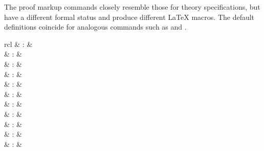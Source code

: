 \begin{isabellebody}
\begin{isamarkuptext}
  \medskip The proof markup commands closely resemble those for theory
  specifications, but have a different formal status and produce
  different {\LaTeX} macros.  The default definitions coincide for
  analogous commands such as \hyperlink{command.section}{\mbox{}} and \hyperlink{command.sect}{\mbox{}}.%
\end{isamarkuptext}%
\isamarkuptrue%
%
\isamarkuptrue%
%
\begin{isamarkuptext}%
\begin{matharray}{rcl}
    \hypertarget{antiquotation.theory}{\hyperlink{antiquotation.theory}{\mbox{}}} & : &  \\
    \hypertarget{antiquotation.thm}{\hyperlink{antiquotation.thm}{\mbox{}}} & : &  \\
    \hypertarget{antiquotation.lemma}{\hyperlink{antiquotation.lemma}{\mbox{}}} & : &  \\
    \hypertarget{antiquotation.prop}{\hyperlink{antiquotation.prop}{\mbox{}}} & : &  \\
    \hypertarget{antiquotation.term}{\hyperlink{antiquotation.term}{\mbox{}}} & : &  \\
    \hypertarget{antiquotation.term-type}{\hyperlink{antiquotation.term-type}{\mbox{}}} & : &  \\
    \hypertarget{antiquotation.typeof}{\hyperlink{antiquotation.typeof}{\mbox{}}} & : &  \\
    \hypertarget{antiquotation.const}{\hyperlink{antiquotation.const}{\mbox{}}} & : &  \\
    \hypertarget{antiquotation.abbrev}{\hyperlink{antiquotation.abbrev}{\mbox{}}} & : &  \\
    \hypertarget{antiquotation.typ}{\hyperlink{antiquotation.typ}{\mbox{}}} & : &  \\
    \hypertarget{antiquotation.type}{\hyperlink{antiquotation.type}{\mbox{}}} & : &  \\

\end{matharray}
\end{isamarkuptext}
\end{isabellebody}

